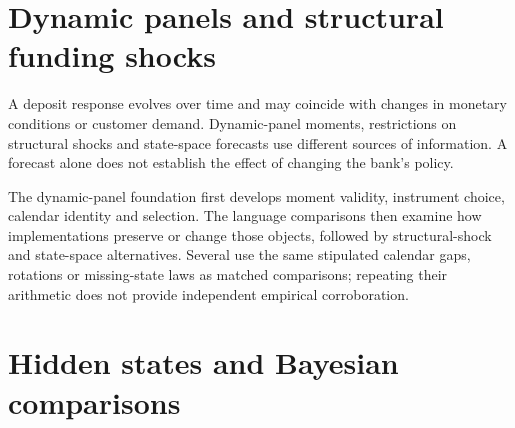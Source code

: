 \documentclass[11pt,a4paper,openany]{book}
\begin{document}











\chapter{Dynamic panels and structural funding shocks}
A deposit response evolves over time and may coincide with changes in
monetary conditions or customer demand. Dynamic-panel moments, restrictions
on structural shocks and state-space forecasts use different sources of
information. A forecast alone does not establish the effect of changing the
bank's policy.

The dynamic-panel foundation first develops moment validity, instrument choice,
calendar identity and selection. The language comparisons then examine how
implementations preserve or change those objects, followed by structural-shock
and state-space alternatives. Several use the same stipulated calendar gaps,
rotations or missing-state laws as matched comparisons; repeating their
arithmetic does not provide independent empirical corroboration.















\chapter{Hidden states and Bayesian comparisons}
\end{document}
